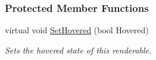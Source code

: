 \subsubsection*{Protected Member Functions}
\begin{DoxyCompactItemize}
\item 
\hypertarget{classMezzanine_1_1UI_1_1Button_acd58ff783face0390389e840879fb8fb}{
virtual void \hyperlink{classMezzanine_1_1UI_1_1Button_acd58ff783face0390389e840879fb8fb}{SetHovered} (bool Hovered)}
\label{classMezzanine_1_1UI_1_1Button_acd58ff783face0390389e840879fb8fb}

\begin{DoxyCompactList}\small\item\em Sets the hovered state of this renderable. \item\end{DoxyCompactList}\end{DoxyCompactItemize}

